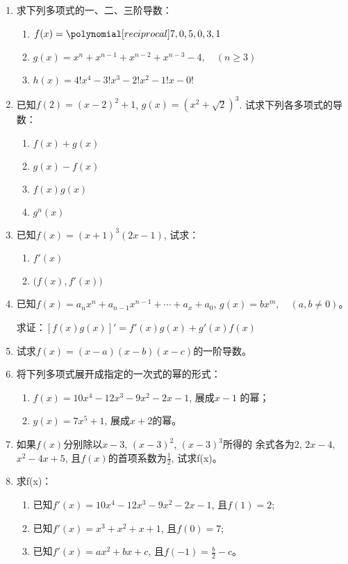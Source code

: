 \begin{enumerate}
    \item 求下列多项式的一、二、三阶导数：
\begin{enumerate}
    \item $f(x)=\poly{7,0,5,0,3,1}$
    \item $g(x)=x^n+x^{n-1}+x^{n-2}+x^{n-3}-4,\quad (n\ge 3)$
    \item $h(x)=4!x^4-3!x^3-2!x^2-1!x-0!$
\end{enumerate}
\item 已知$f(2)=(x-2)^2+1$, $g(x)=(x^2+\sqrt{2})^3$.
试求下列各多项式的导数：
\begin{multicols}{2}
\begin{enumerate}
    \item $f(x)+g(x)$
    \item $g (x) -f (x)$
    \item $f (x) g (x)$
    \item $g^n(x)$
\end{enumerate}
\end{multicols}

\item 已知$f(x)=(x+1)^3(2x-1)$, 试求：
\begin{multicols}{2}
    \begin{enumerate}
        \item $f'(x)$
        \item $\big(f(x),f'(x)\big)$
    \end{enumerate}
    \end{multicols}
\item 已知$f(x)=a_nx^n+a_{n-1}x^{n-1}+\cdots+a_x+a_0$, 
$g(x)=bx^m,\quad (a,b\ne 0)$。

求证：$[f(x)g(x)]'=f'(x)g(x)+g'(x)f(x)$

\item 试求$f(x)=(x-a)(x-b)(x-c)$的一阶导数。
\item 将下列多项式展开成指定的一次式的幂的形式：
\begin{enumerate}
\item $f(x)=10x^4-12x^3-9x^2-2x-1$, 展成$x-1$
的幂；
\item $y(x)=7x^5+1$, 展成$x+2$的幂。
\end{enumerate}

\item 如果$f(x)$分别除以$x-3$, $(x-3)^2$, $(x-3)^3$所得的
余式各为$2$, $2x-4$, $x^2-4x+5$, 且$f(x)$的首项系数为$\frac{1}{2}$, 试求f(x)。
\item 求f(x)：
\begin{enumerate}
\item 已知$f'(x)=10x^4-12x^3-9x^2-2x-1$, 
且$f(1)=2$;
\item 已知$f'(x)=x^3+x^2+x+1$, 且$f(0)=7$;
\item 已知$f'(x)=ax^2+bx+c$, 且$f(-1)=\frac{b}{2}-c$。
\end{enumerate}


\end{enumerate}
